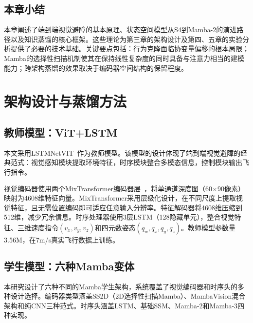 \documentclass[12pt,a4paper]{article}
\makeatletter
\numberwithin{equation}{section}
\numberwithin{figure}{section}
\numberwithin{table}{section}
\newcommand{\cleardoublepage}{\clearpage\if@twoside\ifodd\c@page\else\hbox{}\thispagestyle{empty}\newpage\if@twocolumn\hbox{}\newpage\fi\fi\fi}%
\makeatother
\begin{document}
\subsection{本章小结}

本章阐述了端到端视觉避障的基本原理、状态空间模型从S4到Mamba-2的演进路径以及知识蒸馏的核心框架。这些理论为第三章的架构设计及第四、五章的实验分析提供了必要的技术基础。关键要点包括：行为克隆面临协变量偏移的根本局限；Mamba的选择性扫描机制使其在保持线性复杂度的同时具备与注意力相当的建模能力；跨架构蒸馏的效果取决于编码器空间结构的保留程度。

\cleardoublepage
\section{架构设计与蒸馏方法}

\subsection{教师模型：ViT+LSTM}

本文采用LSTMNetVIT~\cite{bhattacharya2024vitfly}作为教师模型。该模型的设计体现了端到端视觉避障的经典范式：视觉感知模块提取环境特征，时序模块整合多模态信息，控制模块输出飞行指令。

视觉编码器使用两个MixTransformer编码器层~\cite{xie2021segformer}，将单通道深度图（60$\times$90像素）映射为4608维特征向量。MixTransformer采用层级化设计，在不同尺度上提取视觉特征，且无需位置编码即可适应任意输入分辨率。特征解码器将4608维压缩到512维，减少冗余信息。时序处理器使用3层LSTM（128隐藏单元），整合视觉特征、三维速度指令$(v_x, v_y, v_z)$和四元数姿态$(q_w, q_x, q_y, q_z)$。教师模型参数量3.56M，在7m/s真实飞行数据上训练。

\subsection{学生模型：六种Mamba变体}

本研究设计了六种不同的Mamba学生架构，系统覆盖了视觉编码器和时序头的多种设计选择。编码器类型涵盖SS2D（2D选择性扫描Mamba）、MambaVision混合架构和纯CNN三种范式。时序头涵盖LSTM、基础SSM、Mamba-2和Mamba-3四种实现。
\end{document}
